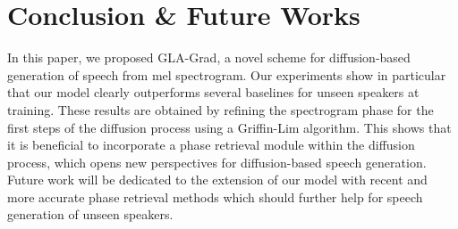 \section{Conclusion \& Future Works}\label{sec:conclusion}
In this paper, we proposed GLA-Grad, a novel scheme for diffusion-based generation of speech from mel spectrogram. Our experiments show in particular that our model clearly outperforms several baselines for unseen speakers at training. These results are obtained by refining the spectrogram phase for the first steps of the diffusion process using a Griffin-Lim algorithm. 
This shows that it is beneficial to incorporate a phase retrieval module within the diffusion process, which opens new perspectives for diffusion-based speech generation. Future work will be dedicated to the extension of our model with recent and more accurate phase retrieval methods which should further help for speech generation of unseen speakers. 